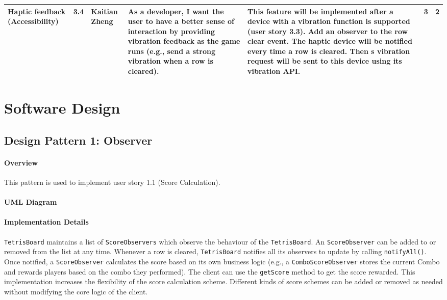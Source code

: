 \documentclass{article}
\begin{document}
\begin{xltabular}{\textwidth}{|p{2cm}|p{0.5cm}|p{1.5cm}|p{3cm}|p{3.5cm}|p{1.75cm}|p{1.25cm}|}
\hline
Haptic feedback (Accessibility)
& 3.4
& Kaitian Zheng
& As a developer, I want the user to have a better sense of interaction by providing vibration feedback as the game runs (e.g., send a strong vibration when a row is cleared). 
& This feature will be implemented after a device with a vibration function is supported (user story 3.3). Add an observer to the row clear event. The haptic device will be notified every time a row is cleared. Then s vibration request will be sent to this device using its vibration API.
& 3 & 2 \\
\hline
\end{xltabular}

\newpage

\section{Software Design}

\subsection{Design Pattern 1: Observer}

\paragraph{Overview}
This pattern is used to implement user story 1.1 (Score Calculation).

\paragraph{UML Diagram}\hfill

\begin{figure}[H]
    
\end{figure}

\paragraph{Implementation Details}

\verb`TetrisBoard` maintains a list of \verb`ScoreObservers` which observe the behaviour of the \verb`TetrisBoard`. An \verb`ScoreObserver` can be added to or removed from the list at any time. Whenever a row is cleared, \verb`TetrisBoard` notifies all its observers to update by calling \verb`notifyAll()`. Once notified, a \verb`ScoreObserver` calculates the score based on its own business logic (e.g., a \verb`ComboScoreObserver` stores the current Combo and rewards players based on the combo they performed). The client can use the \verb`getScore` method to get the score rewarded. This implementation increases the flexibility of the score calculation scheme. Different kinds of score schemes can be added or removed as needed without modifying the core logic of the client.
\end{document}
